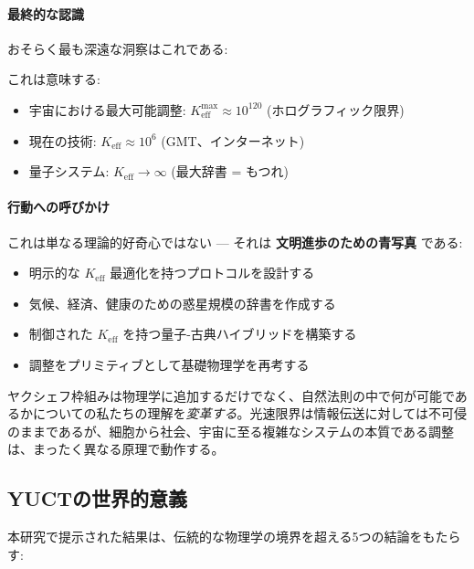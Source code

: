 \documentclass[11pt,a4paper]{article}
\begin{document}
	\paragraph{最終的な認識}
	おそらく最も深遠な洞察はこれである:
	
	\begin{center}
	\end{center}
	
	これは意味する:
	\begin{itemize}
		\item 宇宙における最大可能調整: $K_{\mathrm{eff}}^{\max} \approx 10^{120}$ (ホログラフィック限界)
		\item 現在の技術: $K_{\mathrm{eff}} \approx 10^6$ (GMT、インターネット)
		\item 量子システム: $K_{\mathrm{eff}} \to \infty$ (最大辞書 = もつれ)
	\end{itemize}
	
	\paragraph{行動への呼びかけ}
	これは単なる理論的好奇心ではない — それは \textbf{文明進歩のための青写真} である:
	
	\begin{itemize}
		\item 明示的な $K_{\mathrm{eff}}$ 最適化を持つプロトコルを設計する
		\item 気候、経済、健康のための惑星規模の辞書を作成する
		\item 制御された $K_{\mathrm{eff}}$ を持つ量子-古典ハイブリッドを構築する
		\item 調整をプリミティブとして基礎物理学を再考する
	\end{itemize}
	
	ヤクシェフ枠組みは物理学に追加するだけでなく、自然法則の中で何が可能であるかについての私たちの理解を\emph{変革する}。光速限界は情報伝送に対しては不可侵のままであるが、細胞から社会、宇宙に至る複雑なシステムの本質である調整は、まったく異なる原理で動作する。
	
	\subsection{YUCTの世界的意義}
	
	本研究で提示された結果は、伝統的な物理学の境界を超える5つの結論をもたらす:
	
\end{document}
